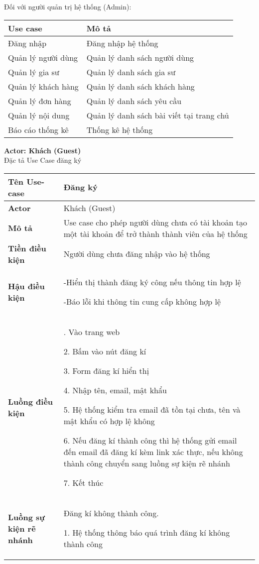 \documentclass[12pt,a4paper]{report}
\begin{document}
 \newpage
 Đối với người quản trị hệ thống (Admin):
 \begin{center}
 \begin{tabular}{|>{\raggedright\arraybackslash}m{4cm}|>{\raggedright\arraybackslash}m{11.5cm}|}
 \hline 
\textbf{Use case} & \textbf{Mô tả} \\
 \hline 
 Đăng nhập & Đăng nhập hệ thống \\ 
 \hline 
  Quản lý người dùng & Quản lý danh sách người dùng \\ 
 \hline 
 Quản lý gia sư & Quản lý danh sách gia sư \\ 
 \hline 
 Quản lý khách hàng & Quản lý danh sách khách hàng \\ 
 \hline 
  Quản lý đơn hàng & Quản lý danh sách yêu cầu \\ 
 \hline 
 Quản lý nội dung & Quản lý danh sách bài viết tại trang chủ \\ 
 \hline 
 Báo cáo thống kê & Thống kê hệ thống \\ 
 \hline 
 \end{tabular} 
 \end{center}
 
 \textbf{Actor: Khách (Guest)}\\
 
 Đặc tả Use Case đăng ký
 \begin{center}
 \begin{tabular}{|>{\raggedright\arraybackslash}m{4cm}|>{\raggedright\arraybackslash}m{11.5cm}|}
 \hline 
 \textbf{Tên Use-case} & Đăng ký \\ 
 \hline 
 \textbf{Actor} & Khách (Guest) \\ 
 \hline 
\textbf{ Mô tả} & Use case cho phép người dùng chưa có tài khoản tạo một tài khoản để trở thành thành viên của hệ thống \\ 
 \hline 
 \textbf{Tiền điều kiện} & Người dùng chưa đăng nhập vào hệ thống \\ 
 \hline 
 \textbf{Hậu điều kiện} & -Hiển thị thành đăng ký công nếu thông tin hợp lệ
 
 				 -Báo lỗi khi thông tin cung cấp không hợp lệ  \\ 
 \hline 
 \textbf{Luồng điều kiện} & 1. Vào trang web
 
				   2. Bấm vào nút đăng kí

			       3. Form đăng kí hiển thị

				   4. Nhập tên, email, mật khẩu
				   
				   5. Hệ thống kiểm tra email đã tồn tại chưa, tên và mật khẩu có hợp lệ
không

				   6. Nếu đăng kí thành công thì hệ thống gửi email đến email đã 							  đăng kí kèm link xác thực, nếu không thành công chuyển sang                luồng sự kiện rẽ nhánh

				   7. Kết thúc \\ 
 \hline 
 \textbf{Luồng sự kiện rẽ nhánh} & Đăng kí không thành công.
 
						1. Hệ thống thông báo quá trình đăng kí không thành công\\ 
 \hline 
 \end{tabular} 
 \end{center}
 
\end{document}
